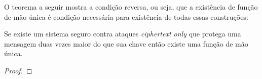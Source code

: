 O teorema a seguir mostra a condição reversa, ou seja, que a existência de função de mão única é condição necessária para existência de todas essas construções:


\begin{theorem}
  Se existe um sistema seguro contra ataques {\em ciphertext only} que protega uma mensagem duas vezes maior do que sua chave então existe uma função de mão única.
\end{theorem}

\begin{proof}
\end{proof}

